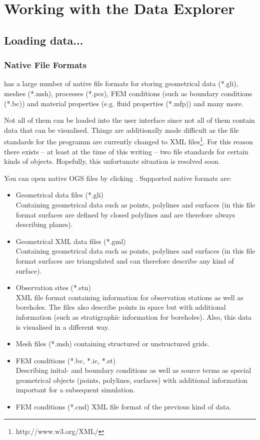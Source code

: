 \chapter{Working with the Data Explorer}

\section{Loading data...}

\subsection{Native File Formats}

\ogs has a large number of native file formats for storing geometrical data (*.gli), meshes (*.msh), processes (*.pcs), FEM conditions (such as boundary conditions (*.bc)) and material properties (e.g. fluid properties (*.mfp)) and many more.

Not all of them can be loaded into the user interface since not all of them contain data that can be visualised. Things are additionally made difficult as the file standards for the programm are currently changed to XML files\footnote{http://www.w3.org/XML/}. For this reason there exists -- at least at the time of this writing -- two file standards for certain kinds of objects. Hopefully, this unfortunate situation is resolved soon.

You can open native OGS files by clicking . Supported native \ogs formats are:
\begin{itemize}
\item Geometrical data files (*.gli)\\
    Containing geometrical data such as points, polylines and surfaces (in this file format surfaces are defined by closed polylines and are therefore always describing planes).
\item Geometrical XML data files (*.gml)\\
    Containing geometrical data such as points, polylines and surfaces (in this file format surfaces are triangulated and can therefore describe any kind of surface).
\item Observation sites (*.stn)\\
    XML file format containing information for observation stations as well as boreholes. The files also describe points in space but with additional information (such as stratigraphic information for boreholes). Also, this data is visualised in a different way.
\item Mesh files (*.msh) containing structured or unstructured grids.
\item FEM conditions (*.bc, *.ic, *.st)\\
    Describing inital- and boundary conditions as well as source terms as special geometrical objects (points, polylines, surfaces) with additional information important for a subsequent simulation.
\item FEM conditions (*.cnd)
    XML file format of the previous kind of data.
\end{itemize}

